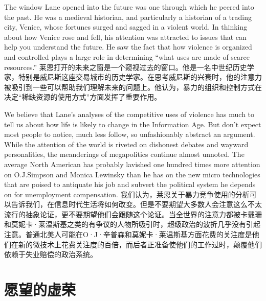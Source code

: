 \begin{Parallel}{97mm}{45mm}
  \ParallelLText
  {The window Lane opened into the future was one through which he peered into the past. He was a medieval historian, and particularly a historian of a trading city, Venice, whose fortunes surged and sagged in a violent world. In thinking about how Venice rose and fell, his attention was attracted to issues that can help you understand the future. He saw the fact that how violence is organized and controlled plays a large role in determining “what uses are made of scarce resources.”  }  
  \ParallelRText
  {\small 莱恩打开的未来之窗是一个窥视过去的窗口。他是一名中世纪历史学家，特别是威尼斯这座交易城市的历史学家。在思考威尼斯的兴衰时，他的注意力被吸引到一些可以帮助我们理解未来的问题上。他认为，暴力的组织和控制方式在决定“稀缺资源的使用方式”方面发挥了重要作用。}
  \ParallelPar



  \ParallelLText
  {We believe that Lane's analyses of the competitive uses of violence has much to tell us about how life is likely to change in the Information Age. But don't expect most people to notice, much less follow, so unfashionably abstract an argument. While the attention of the world is riveted on dishonest debates and wayward personalities, the meanderings of megapolitics continue almost unnoted. The average North American has probably lavished one hundred times more attention on O.J.Simpson and Monica Lewinsky than he has on the new micro technologies that are poised to antiquate his job and subvert the political system he depends on for unemployment compensation.}  
  \ParallelRText
  {\small 我们认为，莱恩关于暴力竞争使用的分析可以告诉我们，在信息时代生活将如何改变。但是不要期望大多数人会注意这么不太流行的抽象论证，更不要期望他们会跟随这个论证。当全世界的注意力都被卡戴珊和莫妮卡·莱温斯基之类的有争议的人物所吸引时，超级政治的波折几乎没有引起注意。普通北美人可能在O·J·辛普森和莫妮卡·莱温斯基方面花费的关注度是他们在新的微技术上花费关注度的百倍，而后者正准备使他们的工作过时，颠覆他们依赖于失业赔偿的政治系统。}
  \ParallelPar

\section{愿望的虚荣}



\end{Parallel}
